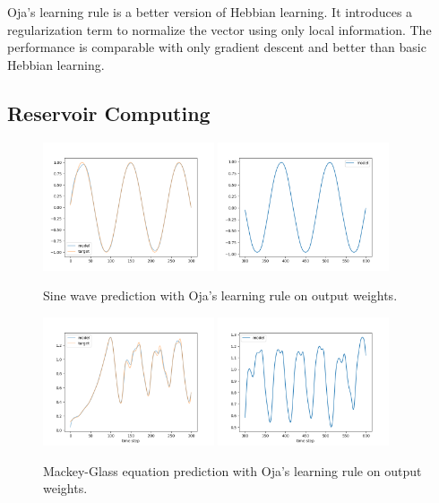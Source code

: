 \documentclass[12pt, a4paper]{article}
\begin{document}
Oja's learning rule is a better version of Hebbian learning. It introduces a regularization term to normalize the vector using only local information. The performance is comparable with only gradient descent and better than basic Hebbian learning.

\subsection*{Reservoir Computing}

\begin{figure}[H]
    \centering
    \includegraphics[width=0.45\textwidth]{fig/sin_liquid_train.png}
    \includegraphics[width=0.45\textwidth]{fig/sin_liquid_pred.png}
    \caption{Sine wave prediction with Oja's learning rule on output weights.}
\end{figure}

\begin{figure}[H]
    \centering
    \includegraphics[width=0.45\textwidth]{fig/MG_liquid_train.png}
    \includegraphics[width=0.45\textwidth]{fig/MG_liquid_pred.png}
    \caption{Mackey-Glass equation prediction with Oja's learning rule on output weights.}
\end{figure}
\end{document}
